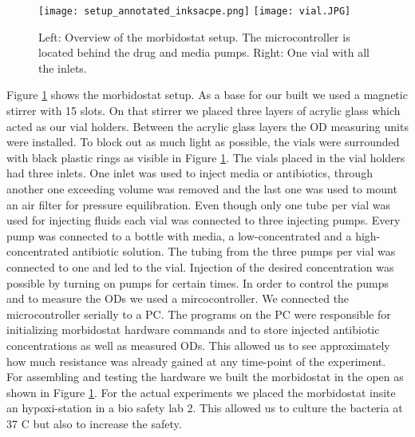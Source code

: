 \begin{figure}[H]
	\texttt{[image: setup\_annotated\_inksacpe.png]}
	\texttt{[image: vial.JPG]}
	\caption{Left: Overview of the morbidostat setup. The microcontroller is located behind the drug and media pumps. Right: One vial with all the inlets.}
	\label{figure:morbidostat_setup}
\end{figure}  
Figure \ref{figure:morbidostat_setup} shows the morbidostat setup.
As a base for our built we used a magnetic stirrer with 15 slots. On that stirrer we placed three layers of acrylic glass which acted as our vial holders. Between the acrylic glass layers the OD measuring units  were installed.  To block out as much light as possible, the vials were surrounded with black plastic rings as visible in Figure \ref{figure:morbidostat_setup}.
The vials placed in the vial holders had three inlets. One inlet was used to inject media or antibiotics, through another one exceeding volume was removed and the last one was used to mount an air filter for pressure equilibration.  Even though only one tube per vial was used for injecting fluids each vial was connected to three injecting pumps. Every pump was connected to a bottle with media, a low-concentrated and a high-concentrated antibiotic solution. The tubing from the three pumps per vial was connected to one and led to the vial. Injection of the desired concentration was possible by turning on pumps for certain times. In order to control the pumps and to measure the ODs we used a mircocontroller. We connected the microcontroller serially to a PC. The programs on the PC were responsible for initializing morbidostat hardware commands and to store injected antibiotic concentrations as well as measured ODs. This allowed us to see approximately how much resistance was already gained at any time-point of the experiment. \\
For assembling and testing the hardware we built the morbidostat in the open as shown in Figure \ref{figure:morbidostat_setup}. For the actual experiments we placed the morbidostat insite an hypoxi-station in a bio safety lab 2. This allowed us to culture the bacteria at 37 \degree C but also to increase the safety. 


